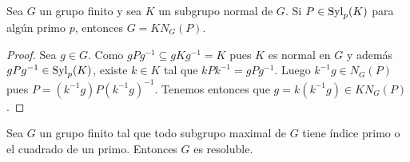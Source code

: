 

\begin{lemma}
	\label{lemma:Frattini_argument}
	Sea $G$ un grupo finito y sea $K$ un subgrupo normal de $G$. Si
	$P\in\mathrm{Syl}_p(K)$ para algún primo $p$, entonces $G=KN_G(P)$.
\end{lemma}

\begin{proof}
	Sea $g\in G$. Como $gPg^{-1}\subseteq gKg^{-1}=K$ pues $K$ es normal en $G$
	y además $gPg^{-1}\in\mathrm{Syl}_p(K)$, existe $k\in K$ tal que
	$kPk^{-1}=gPg^{-1}$. Luego $k^{-1}g\in N_G(P)$ pues
	$P=(k^{-1}g)P(k^{-1}g)^{-1}$. Tenemos entonces que $g=k(k^{-1}g)\in
	KN_G(P)$.
\end{proof}

\begin{theorem}[Hall]
	\label{theorem:Hall}
	Sea $G$ un grupo finito tal que todo subgrupo maximal de $G$ tiene índice
	primo o el cuadrado de un primo. Entonces $G$ es resoluble.
\end{theorem}

